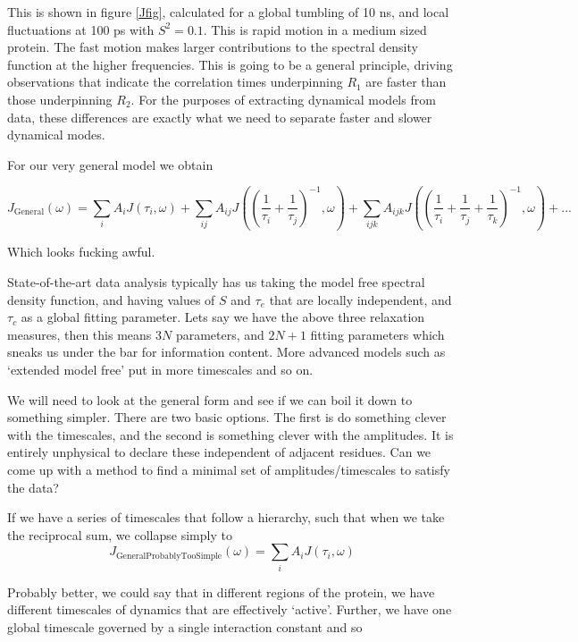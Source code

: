 \documentclass[showkeys,aps,prb,prepreint,amssymb, amsmath,nobibnotes]{article}
\begin{document}
This is shown in figure \ref{Jfig}, calculated for a global tumbling of 10 ns, and local fluctuations at 100 ps with $S^2=0.1$. This is rapid motion in a medium sized protein. The fast motion makes larger contributions to the spectral density function at the higher frequencies. This is going to be a general principle, driving observations that indicate the correlation times underpinning $R_1$ are faster than those underpinning $R_2$. For the purposes of extracting dynamical models from data, these differences are exactly what we need to separate faster and slower dynamical modes.

For our very general model we obtain

\begin{equation}
  J_{\mathrm{General}}(\omega)= \sum_i A_i J(\tau_i,\omega) + \sum_{ij} A_{ij} J\left(  \left(\frac{1}{\tau_i}+\frac{1}{\tau_j}\right)^{-1},\omega\right) +  \sum_{ijk} A_{ijk} J\left(  \left(\frac{1}{\tau_i}+\frac{1}{\tau_j}+\frac{1}{\tau_k}\right)^{-1},\omega\right)+...
  \end{equation}

Which looks fucking awful.

State-of-the-art data analysis typically has us taking the model free spectral density function, and having values of $S$ and $\tau_e$ that are locally independent, and $\tau_c$ as a global fitting parameter. Lets say we have the above three relaxation measures, then this means $3N$ parameters, and $2N+1$ fitting parameters which sneaks us under the bar for information content. More advanced models such as `extended model free' put in more timescales and so on.

We will need to look at the general form and see if we can boil it down to something simpler. There are two basic options. The first is do something clever with the timescales, and the second is something clever with the amplitudes. It is entirely unphysical to declare these independent of adjacent residues. Can we come up with a method to find a minimal set of amplitudes/timescales to satisfy the data?

If we have a series of timescales that follow a hierarchy, such that when we take the reciprocal sum, we collapse simply to
\begin{equation}
  J_{\mathrm{GeneralProbablyTooSimple}}(\omega)= \sum_i A_i J(\tau_i,\omega)
   \end{equation}

Probably better, we could say that in different regions of the protein, we have different timescales of dynamics that are effectively `active'. Further, we have one global timescale governed by a single interaction constant and so
\end{document}
